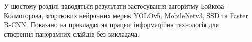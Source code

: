 У шостому розділі наводяться результати 
застосування алгоритму Бойкова-Колмогорова,
згорткових нейронних мереж  YOLOv5, MobileNetv3, SSD та
Faster R-CNN. Показано на прикладах як працює інформаційна
технологія для створення панорамних слайдів без викладача.